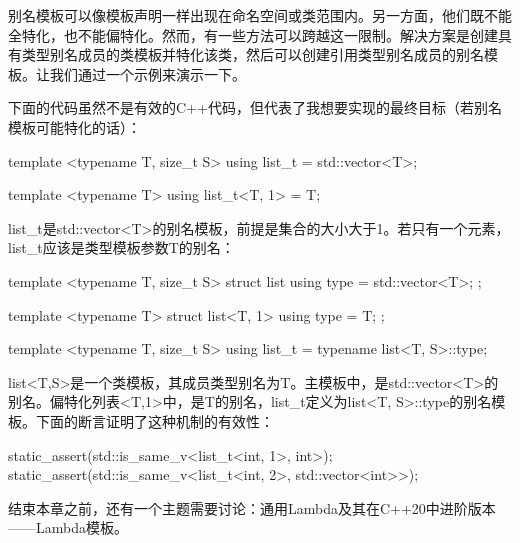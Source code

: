 别名模板可以像模板声明一样出现在命名空间或类范围内。另一方面，他们既不能全特化，也不能偏特化。然而，有一些方法可以跨越这一限制。解决方案是创建具有类型别名成员的类模板并特化该类，然后可以创建引用类型别名成员的别名模板。让我们通过一个示例来演示一下。

下面的代码虽然不是有效的C++代码，但代表了我想要实现的最终目标（若别名模板可能特化的话）：

\begin{cpp}
template <typename T, size_t S>
using list_t = std::vector<T>;

template <typename T>
using list_t<T, 1> = T;
\end{cpp}

list\_t是std::vector<T>的别名模板，前提是集合的大小大于1。若只有一个元素，list\_t应该是类型模板参数T的别名：

\begin{cpp}
template <typename T, size_t S>
struct list
{
	using type = std::vector<T>;
};

template <typename T>
struct list<T, 1>
{
	using type = T;
};

template <typename T, size_t S>
using list_t = typename list<T, S>::type;
\end{cpp}

list<T,S>是一个类模板，其成员类型别名为T。主模板中，是std::vector<T>的别名。偏特化列表<T,1>中，是T的别名，list\_t定义为list<T, S>::type的别名模板。下面的断言证明了这种机制的有效性：

\begin{cpp}
static_assert(std::is_same_v<list_t<int, 1>, int>);
static_assert(std::is_same_v<list_t<int, 2>,
std::vector<int>>);
\end{cpp}

结束本章之前，还有一个主题需要讨论：通用Lambda及其在C++20中进阶版本——Lambda模板。




















